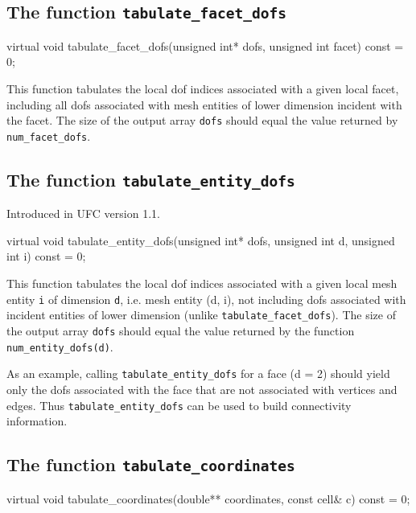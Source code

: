 \subsection{The function \texttt{tabulate\_facet\_dofs}}

\begin{code}
virtual void
tabulate_facet_dofs(unsigned int* dofs,
                    unsigned int facet) const = 0;
\end{code}

This function tabulates the local dof indices associated with a given local
facet, including all dofs associated with mesh entities of lower dimension
incident with the facet. The size of the output array \texttt{dofs} should
equal the value returned by \texttt{num\_facet\_dofs}.

\subsection{The function \texttt{tabulate\_entity\_dofs}}
Introduced in UFC version 1.1.

\begin{code}
virtual void tabulate_entity_dofs(unsigned int* dofs,
                                  unsigned int d,
                                  unsigned int i) const = 0;
\end{code}

This function tabulates the local dof indices associated with a given local
mesh entity \texttt{i} of dimension \texttt{d}, i.e. mesh entity (d, i),
not including dofs associated with incident entities of lower dimension
(unlike \texttt{tabulate\_facet\_dofs}).
The size of the output array \texttt{dofs} should equal
the value returned by the function \texttt{num\_entity\_dofs(d)}.

As an example, calling \texttt{tabulate\_entity\_dofs} for a face (d = 2)
should yield only the dofs associated with the face that are not associated
with vertices and edges. Thus \texttt{tabulate\_entity\_dofs} can
be used to build connectivity information.


\subsection{The function \texttt{tabulate\_coordinates}}

\begin{code}
virtual void tabulate_coordinates(double** coordinates,
                                  const cell& c) const = 0;
\end{code}

